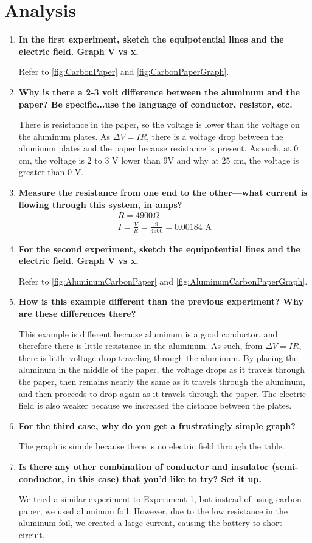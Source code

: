 \documentclass[article, 12pt]{article}
\begin{document}
    \section{Analysis}
    \begin{enumerate}[1)]
      \item \textbf{In the first experiment, sketch the equipotential lines and the electric field. Graph V vs x.}
      
      Refer to \autoref{fig:CarbonPaper} and \autoref{fig:CarbonPaperGraph}.
      \item \textbf{Why is there a 2-3 volt difference between the aluminum and the paper?  Be specific...use the language of conductor, resistor, etc.}
      
      There is resistance in the paper, so the voltage is lower than the voltage on the aluminum plates. As $\Delta V = IR$, there is a voltage drop between the aluminum plates and the paper because resistance is present. As such, at 0 cm, the voltage is 2 to 3 V lower than 9V and why at 25 cm, the voltage is greater than 0 V.
      \item \textbf{Measure the resistance from one end to the other---what current is flowing through this system, in amps?}
      \begin{gather*}
        R = 4900 \Omega \\
        I = \frac{V}{R} = \frac{9}{4900} = 0.00184 \text{ A}
      \end{gather*}
      \item \textbf{For the second experiment, sketch the equipotential lines and the electric field.  Graph V vs x. }
      
      Refer to \autoref{fig:AluminumCarbonPaper} and \autoref{fig:AluminumCarbonPaperGraph}.
      \item \textbf{How is this example different than the previous experiment? Why are these differences there?}
      
      This example is different because aluminum is a good conductor, and therefore there is little resistance in the aluminum. As such, from $\Delta V = IR$, there is little voltage drop traveling through the aluminum. By placing the aluminum in the middle of the paper, the voltage drops as it travels through the paper, then remains nearly the same as it travels through the aluminum, and then proceeds to drop again as it travels through the paper. The electric field is also weaker because we increased the distance between the plates.

      \item \textbf{For the third case, why do you get a frustratingly simple graph?}
      
      The graph is simple because there is no electric field through the table.
      \item \textbf{Is there any other combination of conductor and insulator (semi-conductor, in this case) that you'd like to try?  Set it up.}
      
      We tried a similar experiment to Experiment 1, but instead of using carbon paper, we used aluminum foil. However, due to the low resistance in the aluminum foil, we created a large current, causing the battery to short circuit.
    \end{enumerate}
\end{document}
